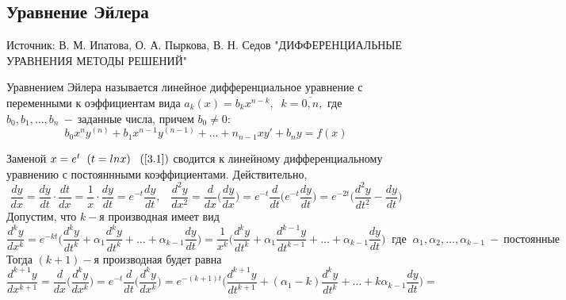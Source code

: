 \subsection{Уравнение Эйлера}
\begin{remark}
Источник: В. М. Ипатова, О. А. Пыркова, В. Н. Седов "ДИФФЕРЕНЦИАЛЬНЫЕ
УРАВНЕНИЯ
МЕТОДЫ РЕШЕНИЙ"
\end{remark}
\begin{definition}
Уравнением Эйлера называется линейное дифференциальное уравнение с переменными к оэффициентам вида $a_k(x)=b_kx^{n-k},\;\;k=\overline{0,n},$ где $b_0,b_1,\dots,b_n~-~$заданные числа, причем $b_0\neq 0:$
\begin{equation}
\tag{3.1}
\label{3.1}
    b_0x^ny^{(n)}+b_1x^{n-1}y^{(n-1)}+\dots+n_{n-1}xy'+b_ny=f(x)
\end{equation}
\end{definition}
Заменой $x=e^t\;\;(t=ln x)\;\;\;(\ref{3.1})$ сводится к линейному дифференциальному уравнению с постояннными коэффициентами. Действительно, $$\frac{dy}{dx}=\frac{dy}{dt}\cdot\frac{dt}{dx}=\frac{1}{x}\cdot \frac{dy}{dt}=e^{-t}\frac{dy}{dt},\;\;\;\frac{d^2y}{dx^2}=\frac{d}{dx}\Big(\frac{dy}{dx}\Big)=e^{-t}\frac{d}{dt}\Big(e^{-t}\frac{dy}{dt}\Big)=e^{-2t}\Big(\frac{d^2y}{dt^2}-\frac{dy}{dt}\Big)$$
Допустим, что $k-$я производная имеет вид $$\frac{d^ky}{dx^k}=e^{-kt}\Big(\frac{d^ky}{dt^k}+\alpha_1\frac{d^ky}{dt^k}+\dots+\alpha_{k-1}\frac{dy}{dt}\Big)=\frac{1}{x^k}\Big(\frac{d^ky}{dt^k}+\alpha_1\frac{d^{k-1}y}{dt^{k-1}}+\dots+\alpha_{k-1}\frac{dy}{dt}\Big)\;\;\text{где}\;\;\alpha_1,\alpha_2,\dots,\alpha_{k-1}~-~\text{постоянные}$$
Тогда $(k+1)-$я производная будет равна \begin{equation}
    \frac{d^{k+1}y}{dx^{k+1}}=\frac{d}{dx}\Big(\frac{d^ky}{dx^k}\Big)=e^{-t}\frac{d}{dt}\Big(\frac{d^ky}{dx^k}\Big)=e^{-(k+1)t}\Big(\frac{d^{k+1}y}{dt^{k+1}}+(\alpha_1-k)\frac{d^ky}{dt^k}+\dots+k\alpha_{k-1}\frac{dy}{dt}\Big) =
\end{equation}
    
